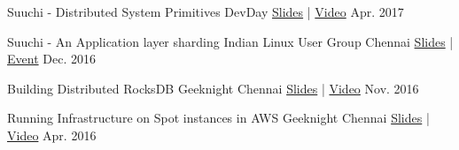 



\begin{cvhonors}

  \cvhonor
    {Suuchi - Distributed System Primitives} %
    {DevDay} %
    {\href{https://speakerdeck.com/ashwanthkumar/suuchi-distributed-system-primitives}{Slides} | \href{https://www.youtube.com/watch?v=0pW6tAM8rIQ}{Video}} %
    {Apr. 2017} %

  \cvhonor
    {Suuchi - An Application layer sharding} %
    {Indian Linux User Group Chennai} %
    {\href{https://speakerdeck.com/ashwanthkumar/suuchi-application-layer-sharding}{Slides} | \href{https://www.meetup.com/ILUG-C/events/233660958/}{Event}} %
    {Dec. 2016} %

  \cvhonor
    {Building Distributed RocksDB} %
    {Geeknight Chennai} %
    {\href{http://bit.ly/distributed-rocksdb}{Slides} | \href{https://www.youtube.com/watch?v=PSCa9_Avne0}{Video}} %
    {Nov. 2016} %

  \cvhonor
    {Running Infrastructure on Spot instances in AWS} %
    {Geeknight Chennai} %
    {\href{http://j.mp/to-matsya-geeknight}{Slides} | \href{https://www.youtube.com/watch?v=qeBV9JRoTOA}{Video}} %
    {Apr. 2016} %

\end{cvhonors}


